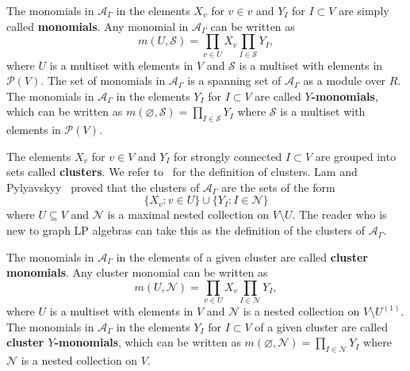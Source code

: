 \documentclass[11pt]{article}
\theoremstyle{definition}
\numberwithin{equation}{section}
\newcommand{\vocab}[1]{\textbf{#1}}
\newcommand{\mtp}[1]{^{(#1)}} \newcommand{\graph}{\varGamma}
\newcommand{\vertices}{V}
\newcommand{\powerset}[1]{\mathcal{P}(#1)}
\newcommand{\coefficientring}{R}
\newcommand{\graphLPalgebra}[1]{\mathcal{A}_{#1}}
\newcommand{\monomial}[2]{m(#1, #2)}
\begin{document}
The monomials in \(\graphLPalgebra{\graph}\) in the elements \(X_v\) for \(v \in v\) and \(Y_I\) for \(I \subset \vertices\) are simply called \vocab{monomials}.
Any monomial in \(\graphLPalgebra{\graph}\) can be written as
\begin{equation*}
    \monomial{U}{\mathcal{S}} =
    \prod_{v \in U} X_v \prod_{I \in \mathcal{S}} Y_I,
\end{equation*}
where \(U\) is a multiset with elements in \(\vertices\) and \(\mathcal{S}\) is a multiset with elements in \(\powerset{\vertices}\).
The set of monomials in \(\graphLPalgebra{\graph}\) is a spanning set of \(\graphLPalgebra{\graph}\) as a module over \(\coefficientring\).
The monomials in \(\graphLPalgebra{\graph}\) in the elements \(Y_I\) for \(I \subset \vertices\) are called \vocab{\(Y\)-monomials}, which can be written as
\( \monomial{\varnothing}{\mathcal{S}} =
    \prod_{I \in \mathcal{S}} Y_I
\)
where \(\mathcal{S}\) is a multiset with elements in \(\powerset{\vertices}\).

The elements \(X_v\) for \(v \in \vertices\) and \(Y_I\) for strongly connected \(I \subset \vertices\) are grouped into sets called \vocab{clusters}.
We refer to~\cite{linearLP} for the definition of clusters.
Lam and Pylyavskyy~\cite{linearLP} proved that the clusters of \(\graphLPalgebra{\graph}\) are the sets of the form
\begin{equation*}
    \{ X_v : v \in U\} \cup \{Y_I : I \in \mathcal{N}\}
\end{equation*}
where \(U \subseteq \vertices\) and \(\mathcal{N}\) is a maximal nested collection on \(\vertices \setminus U\).
The reader who is new to graph LP algebras can take this as the definition of the clusters of \(\graphLPalgebra{\graph}\).

The monomials in \(\graphLPalgebra{\graph}\) in the elements of a given cluster are called \vocab{cluster monomials}.
Any cluster monomial can be written as
\begin{equation*}
    \monomial{U}{\mathcal{N}} =
    \prod_{v \in U} X_v \prod_{I \in \mathcal{N}} Y_I,
\end{equation*}
where \(U\) is a multiset with elements in \(\vertices\) and \(\mathcal{N}\) is a nested collection on \(\vertices \setminus U\mtp{1}\).
The monomials in \(\graphLPalgebra{\graph}\) in the elements \(Y_I\) for \(I \subset \vertices\) of a given cluster are called \vocab{cluster \(Y\)-monomials}, which can be written as \(\monomial{\varnothing}{\mathcal{N}} = \prod_{I \in \mathcal{N}} Y_I\) where \(\mathcal{N}\) is a nested collection on \(\vertices\).
\end{document}
